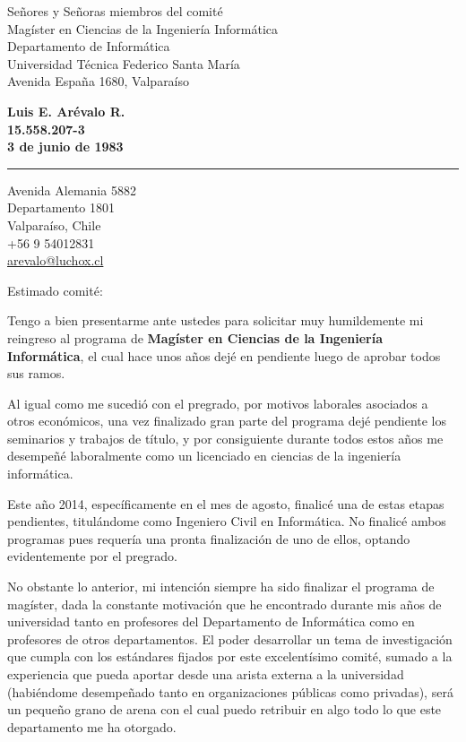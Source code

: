 \documentclass{letter} %
\begin{document}
\signature{Luis E. Arévalo R.}           %
\longindentation=0pt                       %
\let\raggedleft\raggedright                %
 
 
\begin{letter}{Señores y Señoras miembros del comité \\
Magíster en Ciencias de la Ingeniería Informática \\
Departamento de Informática \\
Universidad Técnica Federico Santa María \\
Avenida España 1680, Valparaíso}

\begin{center}
{\large\bf Luis E. Arévalo R. \\ 15.558.207-3 \\ 3 de junio de 1983} 
\end{center}
\medskip\hrule height 1pt
\begin{center}
{Avenida Alemania 5882 \\ Departamento 1801 \\ Valparaíso, Chile \\
  +56 9 54012831 \\ \url{arevalo@luchox.cl}}
\end{center} \vfill %
 
 
\opening{Estimado comité:} 
 
\noindent Tengo a bien presentarme ante ustedes para solicitar muy
humildemente mi reingreso al programa de \textbf{Magíster en Ciencias
  de la Ingeniería Informática}, el cual hace unos años dejé en
pendiente luego de aprobar todos sus ramos.

\noindent Al igual como me sucedió con el pregrado, por motivos
laborales asociados a otros económicos, una vez finalizado gran parte
del programa dejé pendiente los seminarios y trabajos de título, y por
consiguiente durante todos estos años me desempeñé laboralmente como
un licenciado en ciencias de la ingeniería informática.

\noindent Este año 2014, específicamente en el mes de agosto, finalicé
una de estas etapas pendientes, titulándome como Ingeniero Civil en
Informática. No finalicé ambos programas pues requería una pronta
finalización de uno de ellos, optando evidentemente por el pregrado.

\noindent No obstante lo anterior, mi intención siempre ha sido
finalizar el programa de magíster, dada la constante motivación que he
encontrado durante mis años de universidad tanto en profesores del
Departamento de Informática como en profesores de otros departamentos. El poder desarrollar un
tema de investigación que cumpla con los estándares fijados por este
excelentísimo comité, sumado a la experiencia que pueda aportar desde
una arista externa a la universidad (habi\'endome desempeñado tanto en organizaciones públicas como privadas), será un pequeño grano de arena
con el cual puedo retribuir en algo todo lo que este departamento me
ha otorgado.


\end{letter}
\end{document}
